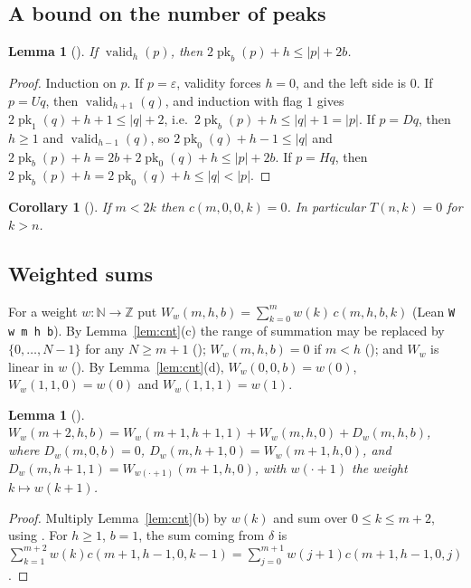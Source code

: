 \documentclass[11pt]{amsart}
\theoremstyle{plain}
\newtheorem{lemma}[theorem]{Lemma}
\newtheorem{corollary}[theorem]{Corollary}
\theoremstyle{definition}
\newcommand{\N}{\mathbb{N}}
\newcommand{\Z}{\mathbb{Z}}
\begin{document}
\subsection{A bound on the number of peaks}

\begin{lemma}[]\label{lem:bound}
If $\operatorname{valid}_h(p)$, then $2\operatorname{pk}_b(p)+h\le|p|+2b$.
\end{lemma}

\begin{proof}
Induction on $p$. If $p=\varepsilon$, validity forces $h=0$, and the left side is $0$. If $p=Uq$, then $\operatorname{valid}_{h+1}(q)$, and induction with flag $1$ gives $2\operatorname{pk}_1(q)+h+1\le|q|+2$, i.e.\ $2\operatorname{pk}_b(p)+h\le|q|+1=|p|$. If $p=Dq$, then $h\ge1$ and $\operatorname{valid}_{h-1}(q)$, so $2\operatorname{pk}_0(q)+h-1\le|q|$ and $2\operatorname{pk}_b(p)+h=2b+2\operatorname{pk}_0(q)+h\le |p|+2b$. If $p=Hq$, then $2\operatorname{pk}_b(p)+h=2\operatorname{pk}_0(q)+h\le|q|<|p|$.
\end{proof}

\begin{corollary}[]\label{cor:bound}
If $m<2k$ then $c(m,0,0,k)=0$. In particular $T(n,k)=0$ for $k>n$.
\end{corollary}

\subsection{Weighted sums}
For a weight $w\colon\N\to\Z$ put $W_w(m,h,b)=\sum_{k=0}^{m}w(k)\,c(m,h,b,k)$ (Lean \texttt{W w m h b}).
By Lemma~\ref{lem:cnt}(c) the range of summation may be replaced by $\{0,\dots,N-1\}$ for any $N\ge m+1$ (); $W_w(m,h,b)=0$ if $m<h$ (); and $W_w$ is linear in $w$ (). By Lemma~\ref{lem:cnt}(d), $W_w(0,0,b)=w(0)$, $W_w(1,1,0)=w(0)$ and $W_w(1,1,1)=w(1)$.

\begin{lemma}[]\label{lem:Wstep}
$W_w(m+2,h,b)=W_w(m+1,h+1,1)+W_w(m,h,0)+D_w(m,h,b)$, where $D_w(m,0,b)=0$, $D_w(m,h+1,0)=W_w(m+1,h,0)$, and $D_w(m,h+1,1)=W_{w(\cdot+1)}(m+1,h,0)$, with $w(\cdot+1)$ the weight $k\mapsto w(k+1)$.
\end{lemma}

\begin{proof}
Multiply Lemma~\ref{lem:cnt}(b) by $w(k)$ and sum over $0\le k\le m+2$, using . For $h\ge1$, $b=1$, the sum coming from $\delta$ is $\sum_{k=1}^{m+2}w(k)c(m+1,h-1,0,k-1)=\sum_{j=0}^{m+1}w(j+1)c(m+1,h-1,0,j)$.
\end{proof}
\end{document}
